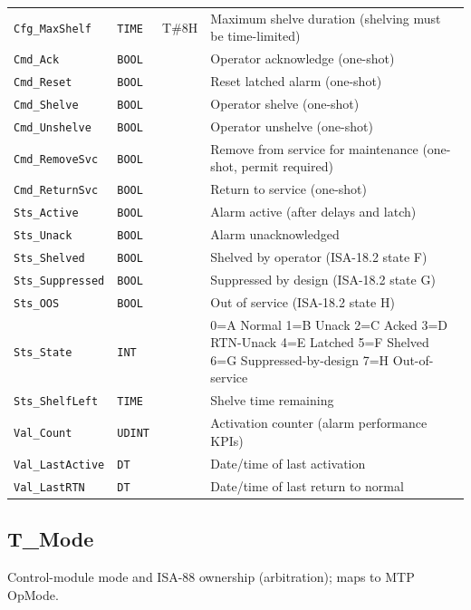 \begin{small}
\begin{longtable}{@{}P{3.70cm}P{2.20cm}P{1.70cm}P{8.91cm}@{}}
\texttt{Cfg\_MaxShelf} & \texttt{TIME} & T\#8H & Maximum shelve duration (shelving must be time-limited) \\
\texttt{Cmd\_Ack} & \texttt{BOOL} &  & Operator acknowledge (one-shot) \\
\texttt{Cmd\_Reset} & \texttt{BOOL} &  & Reset latched alarm (one-shot) \\
\texttt{Cmd\_Shelve} & \texttt{BOOL} &  & Operator shelve (one-shot) \\
\texttt{Cmd\_Unshelve} & \texttt{BOOL} &  & Operator unshelve (one-shot) \\
\texttt{Cmd\_RemoveSvc} & \texttt{BOOL} &  & Remove from service for maintenance (one-shot, permit required) \\
\texttt{Cmd\_ReturnSvc} & \texttt{BOOL} &  & Return to service (one-shot) \\
\texttt{Sts\_Active} & \texttt{BOOL} &  & Alarm active (after delays and latch) \\
\texttt{Sts\_Unack} & \texttt{BOOL} &  & Alarm unacknowledged \\
\texttt{Sts\_Shelved} & \texttt{BOOL} &  & Shelved by operator (ISA-18.2 state F) \\
\texttt{Sts\_Suppressed} & \texttt{BOOL} &  & Suppressed by design (ISA-18.2 state G) \\
\texttt{Sts\_OOS} & \texttt{BOOL} &  & Out of service (ISA-18.2 state H) \\
\texttt{Sts\_State} & \texttt{INT} &  & 0=A Normal 1=B Unack 2=C Acked 3=D RTN-Unack 4=E Latched 5=F Shelved 6=G Suppressed-by-design 7=H Out-of-service \\
\texttt{Sts\_ShelfLeft} & \texttt{TIME} &  & Shelve time remaining \\
\texttt{Val\_Count} & \texttt{UDINT} &  & Activation counter (alarm performance KPIs) \\
\texttt{Val\_LastActive} & \texttt{DT} &  & Date/\allowbreak{}time of last activation \\
\texttt{Val\_LastRTN} & \texttt{DT} &  & Date/\allowbreak{}time of last return to normal \\
\bottomrule
\end{longtable}
\end{small}

\subsection{T\_Mode}\label{sec:pclib-t-mode}

Control-module mode and ISA-88 ownership (arbitration); maps to MTP OpMode.

